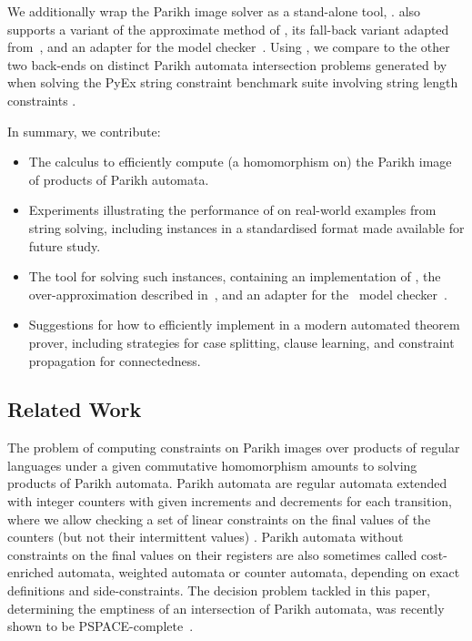 We additionally wrap the Parikh image solver as a stand-alone tool, \Catra.
\Catra{} also supports a variant of the approximate method of
\cite{approximate-parikh}, its fall-back variant adapted
from~\cite{generate-parikh-image}, and an adapter for the \Nuxmv{} model
checker~\cite{nuxmv}. Using \Catra, we compare \Calculus{} to the other two
back-ends on \NrBenchmarks{} distinct Parikh automata intersection problems
generated by \OstrichPlus{} when solving the PyEx string constraint benchmark
suite involving string length constraints \cite{pyex}.

In summary, we contribute:
\begin{itemize}
    \item The \Calculus{} calculus to efficiently compute (a homomorphism on)
          the Parikh image of products of Parikh automata.
    \item Experiments illustrating the performance of \Calculus{} on real-world
    examples from string solving, including \NrBenchmarks{} instances in a
    standardised format made available for future study.
    \item The \Catra{} tool for solving such instances, containing an
    implementation of \Calculus{}, the over-approximation described
    in~\cite{approximate-parikh}, and an adapter for the~\Nuxmv{} model
    checker~\cite{nuxmv}.
    \item Suggestions for how to efficiently implement \Calculus{} in a modern
    automated theorem prover, including strategies for case splitting, clause
    learning, and constraint propagation for connectedness.
\end{itemize}

\subsection{Related Work}

The problem of computing constraints on Parikh images over products of regular
languages under a given commutative homomorphism amounts to solving products of
Parikh automata. Parikh automata are regular automata extended with integer
counters with given increments and decrements for each transition, where we
allow checking a set of linear constraints on the final values of the counters
(but not their intermittent values) \cite{parikh-automata}. Parikh automata
without constraints on the final values on their registers are also sometimes
called cost-enriched automata, weighted automata or counter automata, depending
on exact definitions and side-constraints. The decision problem tackled in this
paper, determining the emptiness of an intersection of Parikh automata, was
recently shown to be PSPACE-complete~\cite{graph-queries}.

